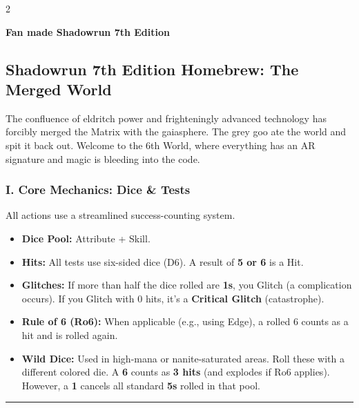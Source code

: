 \documentclass[
  oneside]{article}
\author{}
\date{}
\providecommand{\tightlist}{%
  \setlength{\itemsep}{0pt}\setlength{\parskip}{0pt}}
\begin{document}
\begin{multicols}{2}

\textbf{Fan made Shadowrun 7th Edition}

\hypertarget{shadowrun-7th-edition-homebrew-the-merged-world}{%
\subsection{Shadowrun 7th Edition Homebrew: The
Merged
World}\label{shadowrun-7th-edition-homebrew-the-merged-world}}

The confluence of eldritch power and frighteningly
advanced technology has forcibly merged the Matrix
with the gaiasphere. The grey goo ate the world
and spit it back out. Welcome to the 6th World,
where everything has an AR signature and magic is
bleeding into the code.

\hypertarget{i.-core-mechanics-dice-tests}{%
\subsubsection{I. Core Mechanics: Dice \&
Tests}\label{i.-core-mechanics-dice-tests}}

All actions use a streamlined success-counting
system.

\begin{itemize}
\tightlist
\item
  \textbf{Dice Pool:} Attribute + Skill.
\item
  \textbf{Hits:} All tests use six-sided dice
  (D6). A result of \textbf{5 or 6} is a Hit.
\item
  \textbf{Glitches:} If more than half the dice
  rolled are \textbf{1s}, you Glitch (a
  complication occurs). If you Glitch with 0 hits,
  it's a \textbf{Critical Glitch} (catastrophe).
\item
  \textbf{Rule of 6 (Ro6):} When applicable (e.g.,
  using Edge), a rolled 6 counts as a hit and is
  rolled again.
\item
  \textbf{Wild Dice:} Used in high-mana or
  nanite-saturated areas. Roll these with a
  different colored die. A \textbf{6} counts as
  \textbf{3 hits} (and explodes if Ro6 applies).
  However, a \textbf{1} cancels all standard
  \textbf{5s} rolled in that pool.
\end{itemize}

\begin{center}\rule{0.5\linewidth}{0.5pt}\end{center}

\hypertarget{ii.-the-matrix-the-gaiasphere}{%
}
\end{multicols}
\end{document}
